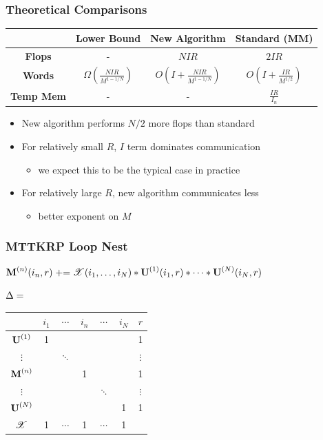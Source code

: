 \documentclass[xcolor=dvipsnames]{beamer}
\newcommand{\plusequals}{\mathrel{+}=}
\begin{document}
\begin{frame}
\frametitle{Theoretical Comparisons}

\begin{center}
\renewcommand{\arraystretch}{2}
\begin{tabular}{|c|ccc|}
\hline
& \textbf{Lower Bound} & \textbf{New Algorithm} & \textbf{Standard (MM)} \\
\hline
\textbf{Flops} & - & $NIR$ & $2IR$ \\
\textbf{Words} & $\Omega\left( \frac{NIR}{M^{1-1/N}} \right)$ & $O\left( I+\frac{NIR}{M^{1-1/N}} \right)$ & $O\left( I+\frac{IR}{M^{1/2}} \right)$ \\
\textbf{Temp Mem} & - & - & $\frac{IR}{I_n}$ \\
\hline
\end{tabular}
\end{center}

\vfill
\pause

\begin{itemize}
	\item New algorithm performs $N/2$ more flops than standard
	\item For relatively small $R$, $I$ term dominates communication
	\begin{itemize}
		\item we expect this to be the typical case in practice
	\end{itemize}
	\item For relatively large $R$, new algorithm communicates less
	\begin{itemize}
		\item better exponent on $M$
	\end{itemize}
\end{itemize}

\end{frame}

\begin{frame}
\frametitle{MTTKRP Loop Nest}

\begin{algorithmic}
	\ForDots
				\State \footnotesize $\Mn{M}{n}(i_n,r) \plusequals \T{X}(i_1,\dots,i_N) * \Mn{U}{1}(i_1,r) * \cdots * \Mn{U}{N}(i_N,r)$
			\EndFor
		\EndFor
	\EndForDots
\EndFor
\end{algorithmic}

\vfill

\begin{center}
$\Large \Delta= \quad\quad$
\begin{tabular}{c|cccccc}
& $i_1$ & $\cdots$ & $i_n$ & $\cdots$ & $i_N$ & $r$ \\
\hline 
$\Mn{U}{1}$ & 1 & & & & & 1 \\
$\vdots$ & & $\ddots$ & & & & $\vdots$ \\
$\Mn{M}{n}$ & & & 1 & & & 1 \\ 
$\vdots$ & & & & $\ddots$ & & $\vdots$ \\
$\Mn{U}{N}$ & & & & & 1 & 1 \\
$\T{X}$ & 1 & $\cdots$ & 1 & $\cdots$ & 1 & 
\end{tabular}
\end{center}

\end{frame}
\end{document}
